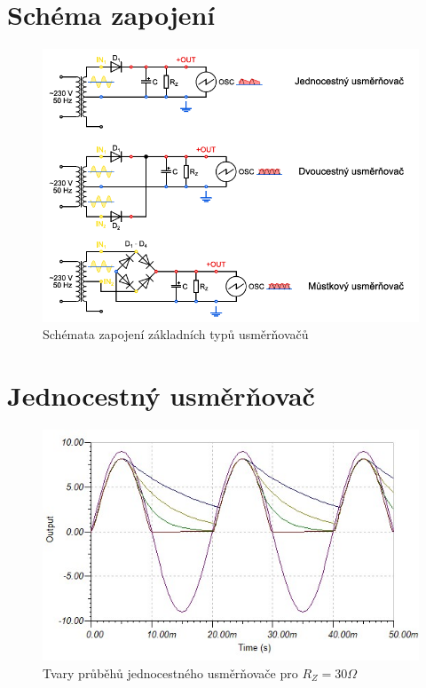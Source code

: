 \documentclass[12pt]{article} %
\begin{document}
\section{Schéma zapojení}
\begin{figure}[H]
\includegraphics[scale=0.8]{schema.png}
\caption{Schémata zapojení základních typů usměrňovačů}
\end{figure}

\section{Jednocestný usměrňovač}
\begin{figure}[H]
\center
\includegraphics[scale=0.7]{jednocestny30.jpg}
\caption{Tvary průběhů jednocestného usměrňovače pro $R_Z = 30\Omega$}
\end{figure}
\end{document}
